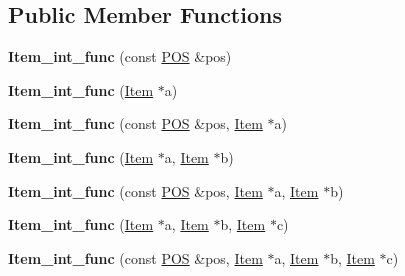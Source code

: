 \subsection*{Public Member Functions}
\begin{DoxyCompactItemize}
\item 
\mbox{\label{classItem__int__func_a5bb8d6833762b27355ccd984dac8536d}} 
{\bfseries Item\+\_\+int\+\_\+func} (const \mbox{\hyperlink{structYYLTYPE}{P\+OS}} \&pos)
\item 
\mbox{\label{classItem__int__func_aabb36e02f41dc008ef0f9c1dc185fbc4}} 
{\bfseries Item\+\_\+int\+\_\+func} (\mbox{\hyperlink{classItem}{Item}} $\ast$a)
\item 
\mbox{\label{classItem__int__func_a1930486bf167ec9764b0dbf410358a28}} 
{\bfseries Item\+\_\+int\+\_\+func} (const \mbox{\hyperlink{structYYLTYPE}{P\+OS}} \&pos, \mbox{\hyperlink{classItem}{Item}} $\ast$a)
\item 
\mbox{\label{classItem__int__func_a66f3e9ef0c0dd26b6ac95f9201076b19}} 
{\bfseries Item\+\_\+int\+\_\+func} (\mbox{\hyperlink{classItem}{Item}} $\ast$a, \mbox{\hyperlink{classItem}{Item}} $\ast$b)
\item 
\mbox{\label{classItem__int__func_aa31fe668559eae8edbcc66e9fa7d2abc}} 
{\bfseries Item\+\_\+int\+\_\+func} (const \mbox{\hyperlink{structYYLTYPE}{P\+OS}} \&pos, \mbox{\hyperlink{classItem}{Item}} $\ast$a, \mbox{\hyperlink{classItem}{Item}} $\ast$b)
\item 
\mbox{\label{classItem__int__func_a2e060477ec53882a491b632c63f7add6}} 
{\bfseries Item\+\_\+int\+\_\+func} (\mbox{\hyperlink{classItem}{Item}} $\ast$a, \mbox{\hyperlink{classItem}{Item}} $\ast$b, \mbox{\hyperlink{classItem}{Item}} $\ast$c)
\item 
\mbox{\label{classItem__int__func_a7c860dc2a3136f854156b9fa363367d9}} 
{\bfseries Item\+\_\+int\+\_\+func} (const \mbox{\hyperlink{structYYLTYPE}{P\+OS}} \&pos, \mbox{\hyperlink{classItem}{Item}} $\ast$a, \mbox{\hyperlink{classItem}{Item}} $\ast$b, \mbox{\hyperlink{classItem}{Item}} $\ast$c)
\item 

\end{DoxyCompactItemize}
